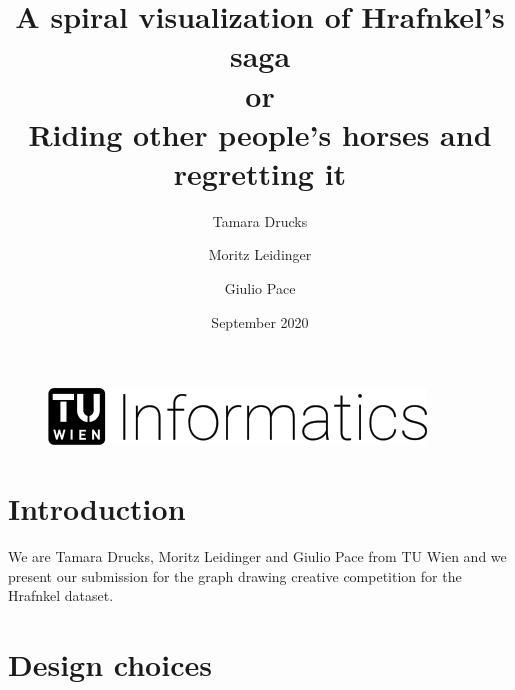 \documentclass[runningheads]{llncs}
\begin{document}
%
\title{A spiral visualization of Hrafnkel's saga \\or \\Riding other people's horses and regretting it}
%
%
\author{Tamara Drucks \and
	Moritz Leidinger \and 
	Giulio Pace}
%

%
%
\date{September 2020}
\maketitle              %
\vspace{-35pt}
\begin{figure}
	\centering
	\includegraphics[width=.3\textwidth]{logo.png}
\end{figure}
\vspace{-25pt}
\section{Introduction}

We are Tamara Drucks, Moritz Leidinger and Giulio Pace from TU Wien and we present our submission for the graph drawing creative competition for the Hrafnkel dataset.


\section{Design choices}
\end{document}
